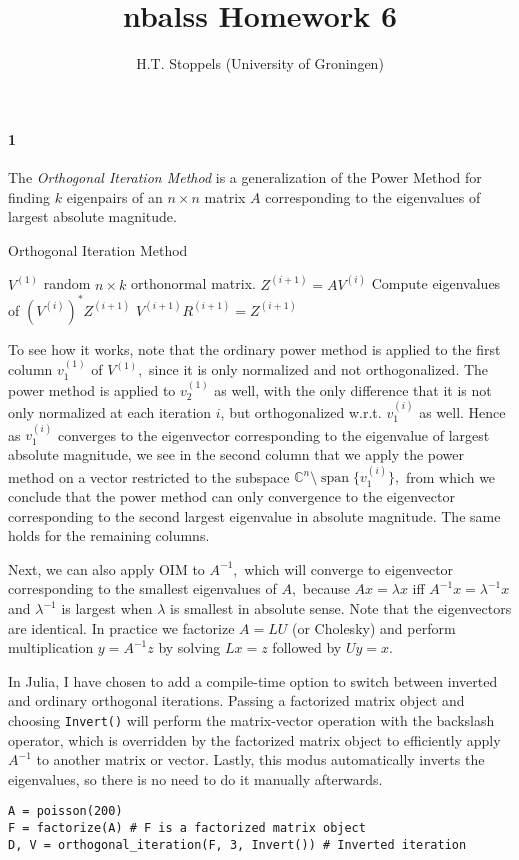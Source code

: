 \documentclass[a4paper]{article}
\author{H.T. Stoppels (University of Groningen)}
\title{{\sc nbalss} Homework 6}
\DeclareMathOperator{\sspan}{span}
\begin{document}
  \maketitle 

  \paragraph{1} The \emph{Orthogonal Iteration Method} is a generalization of the Power Method for finding $k$ eigenpairs of an $n \times n$ matrix $A$ corresponding to the eigenvalues of largest absolute magnitude.

  \begin{algorithm}
\caption{Orthogonal Iteration Method}\label{alg:oim}
\begin{algorithmic}[1]
\State $V^{(1)}$ random $n \times k$ orthonormal matrix.
  \State $Z^{(i+1)} = A V^{(i)}$
  \State Compute eigenvalues of $(V^{(i)})^*Z^{(i+1)}$
  \State $V^{(i+1)}R^{(i+1)} = Z^{(i+1)}$  
\EndFor
\EndProcedure
\end{algorithmic}
\end{algorithm}
  To see how it works, note that the ordinary power method is applied to the first column $v_1^{(1)}$ of $V^{(1)},$ since it is only normalized and not orthogonalized. The power method is applied to $v_2^{(1)}$ as well, with the only difference that it is not only normalized at each iteration $i$, but orthogonalized w.r.t. $v_1^{(i)}$ as well. Hence as $v_1^{(i)}$ converges to the eigenvector corresponding to the eigenvalue of largest absolute magnitude, we see in the second column that we apply the power method on a vector restricted to the subspace $\mathbb{C}^n \setminus \sspan\{v_1^{(i)}\},$ from which we conclude that the power method can only convergence to the eigenvector corresponding to the second largest eigenvalue in absolute magnitude. The same holds for the remaining columns.

  Next, we can also apply OIM to $A^{-1},$ which will converge to eigenvector corresponding to the smallest eigenvalues of $A,$ because $Ax = \lambda x$ iff $A^{-1}x = \lambda^{-1}x$ and $\lambda^{-1}$ is largest when $\lambda$ is smallest in absolute sense. Note that the eigenvectors are identical. In practice we factorize $A = LU$ (or Cholesky) and perform multiplication $y = A^{-1}z$ by solving $Lx = z$ followed by $Uy = x.$

  In Julia, I have chosen to add a compile-time option to switch between inverted and ordinary orthogonal iterations. Passing a factorized matrix object and choosing {\tt Invert()} will perform the matrix-vector operation with the backslash operator, which is overridden by the factorized matrix object to efficiently apply $A^{-1}$ to another matrix or vector. Lastly, this modus automatically inverts the eigenvalues, so there is no need to do it manually afterwards.
  \begin{lstlisting}
A = poisson(200)
F = factorize(A) # F is a factorized matrix object
D, V = orthogonal_iteration(F, 3, Invert()) # Inverted iteration
  \end{lstlisting}
\end{document}

